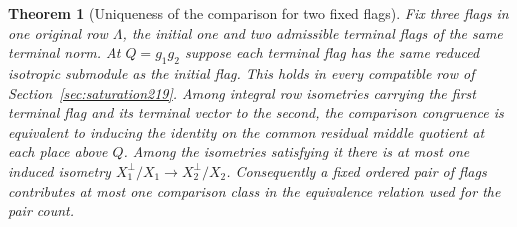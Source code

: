 \documentclass[a4paper,11pt]{article}
\newtheorem{theorem}[proposition]{Theorem}
\theoremstyle{definition}
\theoremstyle{remark}
\numberwithin{equation}{section}
\begin{document}
\begin{theorem}[Uniqueness of the comparison for two fixed flags]
\label{thm:unique221}
Fix three flags in one original row \(\Lambda\), the initial
one and two admissible terminal flags of the same terminal
norm. At \(Q=g_1g_2\) suppose each terminal flag has the same
reduced isotropic submodule as the initial flag. This holds
in every compatible row of Section~\ref{sec:saturation219}.
Among integral row isometries carrying the first terminal
flag and its terminal vector to the second, the comparison
congruence is equivalent to inducing the identity on the common
residual middle quotient at each place above \(Q\). Among the
isometries satisfying it there is at most one induced
isometry \(X_1^\perp/X_1\to X_2^\perp/X_2\). Consequently a
fixed ordered pair of flags contributes at most one comparison
class in the equivalence relation used for the pair count.
\end{theorem}
\end{document}
